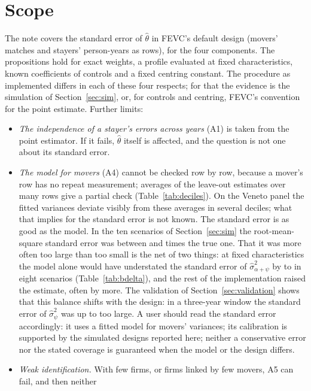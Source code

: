 \section{Scope}\label{sec:scope}

The note covers the standard error of $\hat\theta$ in FEVC's default design (movers' matches and stayers'
person-years as rows), for the four components. The propositions hold for exact weights, a profile evaluated
at fixed characteristics, known coefficients of controls and a fixed centring constant. The procedure as
implemented differs in each of these four respects; for that the evidence is the simulation of
Section~\ref{sec:sim}, or, for controls and centring, FEVC's convention for the point estimate. Further limits:
\begin{itemize}
\item \emph{The independence of a stayer's errors across years} (A1) is taken from the point estimator. If it
fails, $\hat\theta$ itself is affected, and the question is not one about its standard error.
\item \emph{The model for movers} (A4) cannot be checked row by row, because a mover's row has no repeat
measurement; averages of the leave-out estimates over many rows give a partial check
(Table~\ref{tab:deciles}). On the Veneto panel the fitted variances deviate visibly from these averages in
several deciles; what that implies for the standard error is not known. The standard error is as good as the
model. In the ten scenarios of Section~\ref{sec:sim} the root-mean-square standard error was between
 and  times the true one. That it was more often too large than too small is the
net of two things: at fixed characteristics the model alone would have understated the standard error of
$\hat\sigma^2_{\alpha+\psi}$ by  to  in eight scenarios
(Table~\ref{tab:bdelta}), and the rest of the implementation raised the estimate, often by more. The
validation of Section~\ref{sec:validation} shows that this balance shifts with the design: in a three-year
window the standard error of $\hat\sigma^2_\psi$ was up to  too large. A
user should read the standard error accordingly: it uses a fitted model for movers' variances; its calibration
is supported by the simulated designs reported here; neither a conservative error nor the stated coverage is
guaranteed when the model or the design differs.
\item \emph{Weak identification.} With few firms, or firms linked by few movers, A5 can fail, and then neither

\end{itemize}

